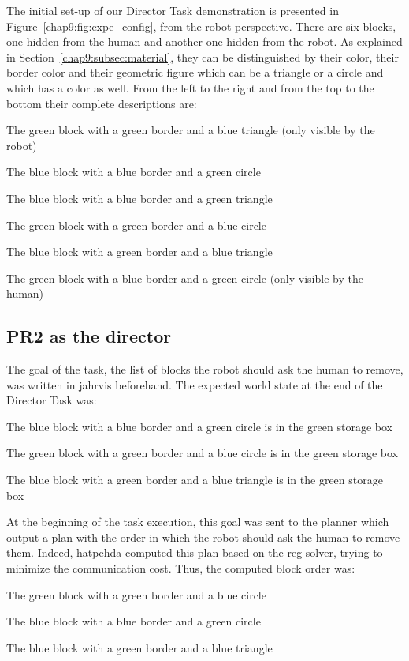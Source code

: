 \documentclass[a4paper,11pt,twoside]{StyleThese}
\begin{document}
The initial set-up of our Director Task demonstration is presented in Figure~\ref{chap9:fig:expe_config}, from the robot perspective. There are six blocks, one hidden from the human and another one hidden from the robot. As explained in Section~\ref{chap9:subsec:material}, they can be distinguished by their color, their border color and their geometric figure which can be a triangle or a circle and which has a color as well. From the left to the right and from the top to the bottom their complete descriptions are:
\begin{bulletList}
	\item The green block with a green border and a blue triangle (only visible by the robot)
	\item The blue block with a blue border and a green circle
	\item The blue block with a blue border and a green triangle
	\item The green block with a green border and a blue circle
	\item The blue block with a green border and a blue triangle
	\item The green block with a blue border and a green circle (only visible by the human)
\end{bulletList}

\subsection{PR2 as the director}

The goal of the task, \ie the list of blocks the robot should ask the human to remove, was written in \acrshort{jahrvis} beforehand. The expected world state at the end of the Director Task was:
\begin{bulletList}
	\item The blue block with a blue border and a green circle is in the green storage box
	\item The green block with a green border and a blue circle is in the green storage box
	\item The blue block with a green border and a blue triangle is in the green storage box
\end{bulletList}


At the beginning of the task execution, this goal was sent to the planner which output a plan with the order in which the robot should ask the human to remove them. Indeed, \acrshort{hatpehda} computed this plan based on the \acrfull{reg} solver, trying to minimize the communication cost. Thus, the computed block order was:
\begin{enumList}
	\item The green block with a green border and a blue circle
	\item The blue block with a blue border and a green circle
	\item The blue block with a green border and a blue triangle
\end{enumList}
\end{document}
